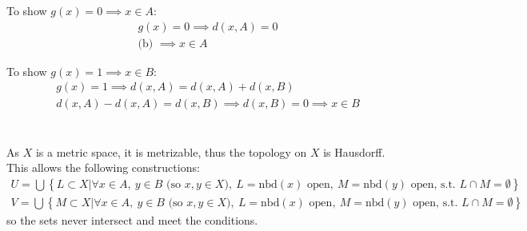 \documentclass{jhwhw}
\begin{document}
To show $g(x) = 0\implies x\in A $:
\begin{gather}
g(x) = 0 \implies d(x,A)=0\\
\text{(b) }\implies x\in A
\end{gather}

To show $g(x) = 1\implies x\in B $:
\begin{gather}
g(x) = 1 \implies d(x,A)=d(x,A)+d(x,B)\\
d(x,A)-d(x,A)=d(x,B)\implies d(x,B)=0 \implies x\in B
\end{gather}

\part{}%
As $X$ is a metric space, it is metrizable, thus the topology on $X$ is Hausdorff. This allows the following constructions:
\begin{gather}
U=\bigcup\left\{ L\subset X | \forall x\in A,\: y\in B\text{ (so } x,y \in X \text{)}, \: L=\text{nbd}(x) \text{ open}, \: M=\text{nbd}(y) \text{ open, s.t. } L\cap M=\emptyset\right\}\\
V=\bigcup\left\{ M\subset X | \forall x\in A,\: y\in B\text{ (so } x,y \in X \text{)}, \: L=\text{nbd}(x) \text{ open}, \: M=\text{nbd}(y) \text{ open, s.t. } L\cap M=\emptyset\right\}
\end{gather}
so the sets never intersect and meet the conditions.
\end{document}

